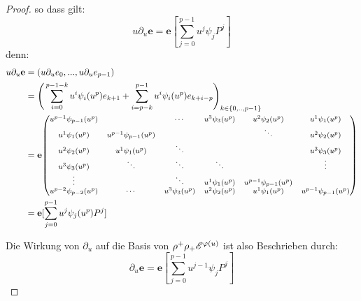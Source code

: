 \begin{proof}
so dass gilt:
\[ u\partial_u\mathbf{e}=\mathbf{e}[\sum_{j=0}^{p-1}u^j\psi_jP^j] \]
denn:\\
\begin{align*}
  u\partial_u\mathbf{e} &= (u\partial_ue_0,...,u\partial_ue_{p-1})\\
  &= \Bigg(\sum_{i=0}^{p-1-k}u^i\psi_i(u^p)e_{k+1} +
    \sum_{i=p-k}^{p-1}u^i\psi_i(u^p)e_{k+i-p}\Bigg)_{k\in\{0,..,p-1\}}\\
  &= \mathbf{e}
{ %
  \footnotesize
  \begin{pmatrix}u^{p-1}\psi_{p-1}(u^p) &  & \cdots & u^{3}\psi_{3}(u^p) & u^{2}
    \psi_{2}(u^p) & u^{1}\psi_{1}(u^p)\\
    u^{1}\psi_{1}(u^p) & u^{p-1}\psi_{p-1}(u^p) &  &
    & \ddots & u^{2}\psi_{2}(u^p)\\
    u^{2}\psi_{2}(u^p) & u^{1}\psi_{1}(u^p) & \ddots &  &  & u^{3}\psi_{3}(u^p)\\
    u^{3}\psi_{3}(u^p) & \ddots & \ddots & \ddots &  & \vdots\\
    \vdots &  & \ddots & u^{1}\psi_{1}(u^p) & u^{p-1}\psi_{p-1}(u^p)\\
    u^{p-2}\psi_{p-2}(u^p) & \cdots & u^{3}\psi_{3}(u^p) & u^{2}\psi_{2}(u^p) &
    u^{1}\psi_{1}(u^p) & u^{p-1}\psi_{p-1}(u^p)
  \end{pmatrix}
} \\
  &= \mathbf{e}[\sum_{j=0}^{p-1}u^j\psi_j(u^p)P^j]
\end{align*}


Die Wirkung von $\partial_u$ auf die Basis von $\rho^+\rho_+\mathscr{E}^{\varphi(u)}$ ist
also Beschrieben durch:
\[ \partial_u\mathbf{e}=\mathbf{e}[\sum_{j=0}^{p-1}u^{j-1}\psi_jP^j] \]


\end{proof}
